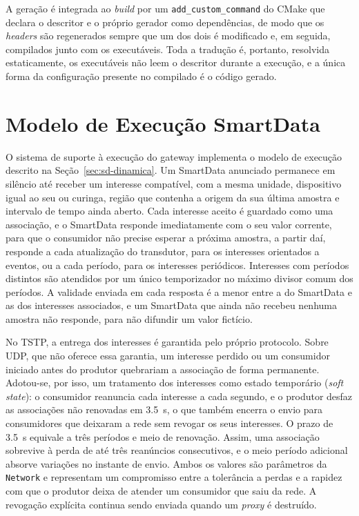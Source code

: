 \documentclass[
    12pt,
    oneside,
    a4paper,
    chapter=TITLE,
    section=TITLE,
    english,
    brazil
]{abntex2}
\begin{document}
A geração é integrada ao \textit{build} por um
\texttt{add\_custom\_command} do CMake que declara o descritor e o próprio
gerador como dependências, de modo que os \textit{headers} são
regenerados sempre que um dos dois é modificado e, em seguida,
compilados junto com os executáveis. Toda a tradução é, portanto,
resolvida estaticamente, os executáveis não leem o descritor durante a
execução, e a única forma da configuração presente no compilado é o
código gerado.

\section{Modelo de Execução SmartData}
\label{sec:dinamica}

O sistema de suporte à execução do gateway implementa o modelo de execução
descrito na Seção~\ref{sec:sd-dinamica}. Um SmartData anunciado permanece em
silêncio até receber um interesse compatível, com a mesma unidade, dispositivo
igual ao seu ou curinga, região que contenha a origem da sua última
amostra e intervalo de tempo ainda aberto. Cada interesse aceito é
guardado como uma associação, e o SmartData responde imediatamente com o
seu valor corrente, para que o consumidor não precise esperar a próxima
amostra, a partir daí, responde a cada atualização do transdutor, para os
interesses orientados a eventos, ou a cada período, para os interesses
periódicos. Interesses com períodos distintos são atendidos por um único
temporizador no máximo divisor comum dos períodos. A validade enviada em
cada resposta é a menor entre a do SmartData e as dos interesses
associados, e um SmartData que ainda não recebeu nenhuma amostra não
responde, para não difundir um valor fictício.

No TSTP, a entrega dos interesses é garantida pelo próprio protocolo.
Sobre UDP, que não oferece essa garantia, um interesse perdido ou um
consumidor iniciado antes do produtor quebrariam a associação de forma
permanente. Adotou-se, por isso, um tratamento dos interesses como estado
temporário (\textit{soft state}): o consumidor reanuncia cada interesse a cada segundo, e o produtor
desfaz as associações não renovadas em \SI{3.5}{\second}, o que também
encerra o envio para consumidores que deixaram a rede sem revogar os seus
interesses. O prazo de \SI{3.5}{\second} equivale a três períodos e meio
de renovação. Assim, uma associação sobrevive à perda de até três
reanúncios consecutivos, e o meio período adicional absorve variações no
instante de envio. Ambos os valores são parâmetros da \texttt{Network} e
representam um compromisso entre a tolerância a perdas e a rapidez com
que o produtor deixa de atender um consumidor que saiu da rede. A
revogação explícita continua sendo enviada quando um
\textit{proxy} é destruído.
\end{document}
